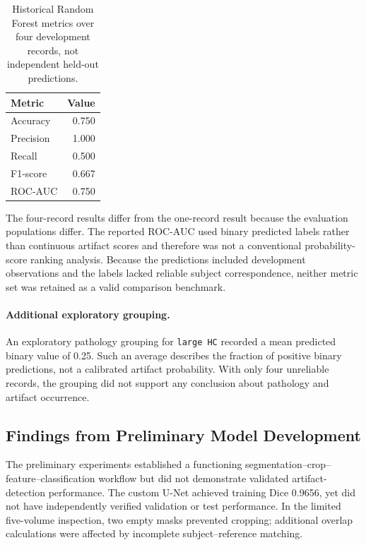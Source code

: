 \begin{table}[htbp]
\centering
\caption{Historical Random Forest metrics over four development records, not independent held-out predictions.}
\label{tab:historical_rf_metrics}
\begin{tabular}{lr}
\hline
Metric & Value \\
\hline
Accuracy & 0.750 \\
Precision & 1.000 \\
Recall & 0.500 \\
F1-score & 0.667 \\
ROC-AUC & 0.750 \\
\hline
\end{tabular}
\end{table}

The four-record results differ from the one-record result because the evaluation populations differ. The reported ROC-AUC used binary predicted labels rather than continuous artifact scores and therefore was not a conventional probability-score ranking analysis. Because the predictions included development observations and the labels lacked reliable subject correspondence, neither metric set was retained as a valid comparison benchmark.

\paragraph{Additional exploratory grouping.}
An exploratory pathology grouping for \texttt{large HC} recorded a mean predicted binary value of 0.25. Such an average describes the fraction of positive binary predictions, not a calibrated artifact probability. With only four unreliable records, the grouping did not support any conclusion about pathology and artifact occurrence.

\subsection{Findings from Preliminary Model Development}
\label{subsec:historical_3d_findings}

The preliminary experiments established a functioning segmentation--crop--feature--classification workflow but did not demonstrate validated artifact-detection performance. The custom U-Net achieved training Dice 0.9656, yet did not have independently verified validation or test performance. In the limited five-volume inspection, two empty masks prevented cropping; additional overlap calculations were affected by incomplete subject--reference matching.

